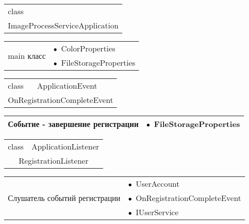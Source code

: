 \newcommand{\bdot}{\(\bullet\hspace{0.5em}\)}

\begin{table}[H]
\begin{tabular}{|p{8cm} p{8cm}|} 
\hline class &  \\
\multicolumn{2}{|c|}{ImageProcessServiceApplication} \\ \hline
\end{tabular}
\begin{tabular}{|p{8cm}|p{8cm}|} 
\multirow{2}{=}{ main класс } 
& \bdot ColorProperties \\
& \bdot FileStorageProperties \\
\hline 
\end{tabular}
 \label{crc-table-first}
\end{table}

\begin{table}[H]
\begin{tabular}{|p{8cm} p{8cm}|} 
\hline class & ApplicationEvent \\
\multicolumn{2}{|c|}{OnRegistrationCompleteEvent} \\ \hline
\end{tabular}
\begin{tabular}{|p{8cm}|p{8cm}|} 
  Событие - завершение регистрации  & \bdot FileStorageProperties \\
\hline 
\end{tabular}
 \label{crc-table-2}
\end{table}

\begin{table}[H]
\begin{tabular}{|p{8cm} p{8cm}|} 
\hline class & ApplicationListener \\
\multicolumn{2}{|c|}{RegistrationListener} \\ \hline
\end{tabular}
\begin{tabular}{|p{8cm}|p{8cm}|} 
\multirow{3}{=}{ Слушатель событий регистрации } 
& \bdot UserAccount \\
& \bdot OnRegistrationCompleteEvent \\
& \bdot IUserService \\
\hline 
\end{tabular}
 \label{crc-table-3}
\end{table}

